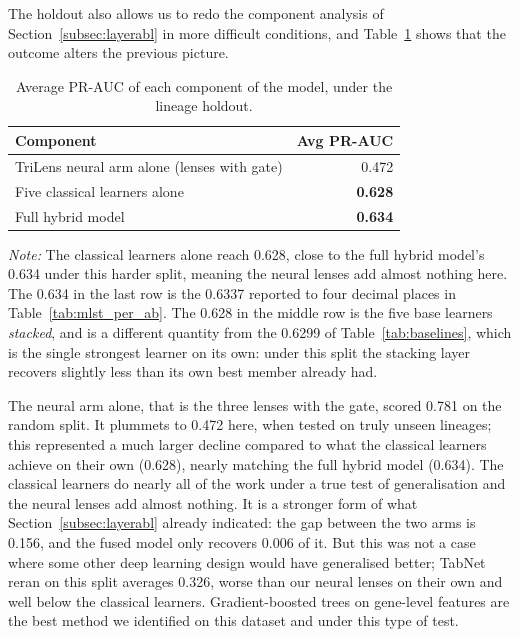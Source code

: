 \documentclass[journal]{IEEEtran}
\begin{document}
The holdout also allows us to redo the component analysis of
Section~\ref{subsec:layerabl} in more difficult conditions, and
Table~\ref{tab:mlst_components} shows that the outcome alters the previous picture.

\begin{table}[!tb]
\caption{Average PR-AUC of each component of the model, under the lineage holdout.}
\label{tab:mlst_components}
\centering
\small
\setlength{\tabcolsep}{4pt}
\renewcommand{\arraystretch}{1.05}
\begin{tabular}{|l|r|}
\hline
\rowcolor{headgrey}
\textbf{Component} & \textbf{Avg PR-AUC} \\ \hline
TriLens neural arm alone (lenses with gate) & 0.472 \\ \hline
Five classical learners alone & \textbf{0.628} \\ \hline
\rowcolor{oursblue}
Full hybrid model & \textbf{0.634} \\ \hline
\end{tabular}
\renewcommand{\arraystretch}{1.0}
\vspace{0.4em}

\noindent\footnotesize\textit{Note:} The classical learners alone reach 0.628, close to the full
hybrid model's 0.634 under this harder split, meaning the neural lenses add almost nothing here.
The 0.634 in the last row is the 0.6337 reported to four decimal places in
Table~\ref{tab:mlst_per_ab}. The 0.628 in the middle row is the five base
learners \emph{stacked}, and is a different quantity from the 0.6299 of
Table~\ref{tab:baselines}, which is the single strongest learner on its own: under
this split the stacking layer recovers slightly less than its own best member
already had.
\end{table}

The neural arm alone, that is the three lenses with the gate, scored 0.781 on the
random split. It plummets to 0.472 here, when tested on truly unseen lineages; this
represented a much larger decline compared to what the classical learners achieve on
their own (0.628), nearly matching the full hybrid model (0.634). The classical
learners do nearly all of the work under a true test of generalisation and the neural
lenses add almost nothing. It is a stronger form of what
Section~\ref{subsec:layerabl} already indicated: the gap between the two arms is
0.156, and the fused model only recovers 0.006 of it. But this was not a case where
some other deep learning design would have generalised better; TabNet reran on this
split averages 0.326, worse than our neural lenses on their own and well below the
classical learners. Gradient-boosted trees on gene-level features are the best method
we identified on this dataset and under this type of test.
\end{document}
